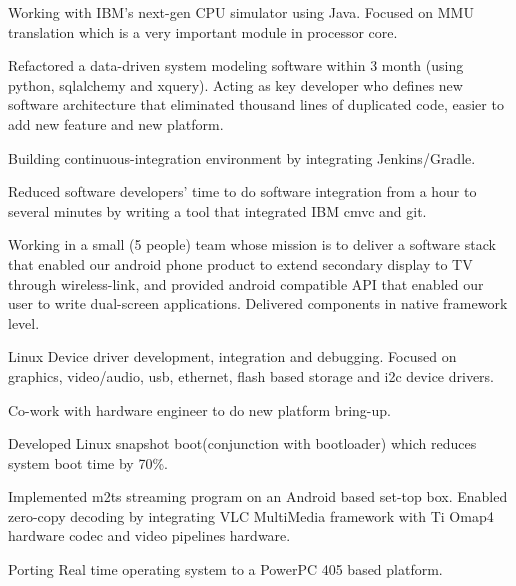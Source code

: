 \documentclass[letterpaper]{deedy-resume} %
\begin{document}
\begin{minipage}[t]{0.66\textwidth}
\begin{tightitemize}
\item Working with IBM’s next-gen CPU simulator using Java. Focused on MMU translation which is a very important module in processor core.
\item Refactored a data-driven system modeling software within 3 month (using python, sqlalchemy and xquery). Acting as key developer who defines new software architecture that eliminated thousand lines of duplicated code, easier to add new feature and new platform.
\item Building continuous-integration environment by integrating Jenkins/Gradle.
\item Reduced software developers’ time to do software integration from a hour to several minutes by writing a tool that integrated IBM cmvc and git.
\end{tightitemize}

\sectionspace %



\begin{tightitemize}
\item Working in a small (5 people) team whose mission is to deliver a software stack that enabled our android phone product to extend secondary display to TV through wireless-link, and provided android compatible API that enabled our user to write dual-screen applications. Delivered components in native framework level.
\end{tightitemize}

\sectionspace %



\begin{tightitemize}
\item Linux Device driver development, integration and debugging. Focused on graphics, video/audio, usb, ethernet, flash based storage and i2c device drivers.
\item Co-work with hardware engineer to do new platform bring-up.
\item Developed Linux snapshot boot(conjunction with bootloader) which reduces system boot time by 70\%.
\item Implemented m2ts streaming program on an Android based set-top box. Enabled zero-copy decoding by integrating VLC MultiMedia framework with Ti Omap4 hardware codec and video pipelines hardware.
\item Porting Real time operating system to a PowerPC 405 based platform.
\end{tightitemize}


\end{minipage}
\end{document}

